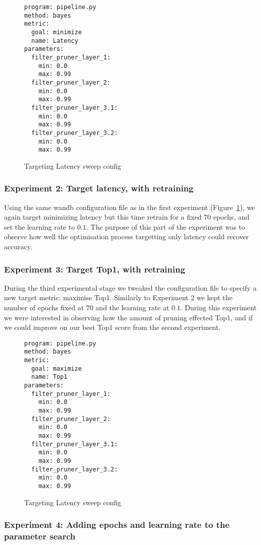 \documentclass[../Dissertation.tex]{subfiles}
\begin{document}
\singlespacing
\begin{figure}[H]
    \centering
    \begin{verbatim}
program: pipeline.py
method: bayes
metric:
  goal: minimize
  name: Latency
parameters:
  filter_pruner_layer_1:
    min: 0.0
    max: 0.99
  filter_pruner_layer_2:
    min: 0.0
    max: 0.99
  filter_pruner_layer_3.1:
    min: 0.0
    max: 0.99
  filter_pruner_layer_3.2:
    min: 0.0
    max: 0.99
    \end{verbatim}
    \caption{Targeting Latency sweep config}
    \label{fig:LatencySweepConfig}
\end{figure}
\doublespacing

\subsubsection{Experiment 2: Target latency, with retraining}

Using the same wandb configuration file as in the first experiment (Figure~\ref{fig:LatencySweepConfig}), we again target minimizing latency but this time retrain for a fixed $70$ epochs, and set the learning rate to $0.1$.
The purpose of this part of the experiment was to observe how well the optimisation process targetting only latency could recover accuracy.

\subsubsection{Experiment 3: Target Top1, with retraining}
During the third experimental stage we tweaked the configuration file to specify a new target metric: maximise Top1.
Similarly to Experiment 2 we kept the number of epochs fixed at $70$ and the learning rate at $0.1$.
During this experiment we were interested in observing how the amount of pruning effected Top1, and if we could improve on our best Top1 score from the second experiment.

\singlespacing
\begin{figure}[H]
    \centering
    \begin{verbatim}
program: pipeline.py
method: bayes
metric:
  goal: maximize
  name: Top1
parameters:
  filter_pruner_layer_1:
    min: 0.0
    max: 0.99
  filter_pruner_layer_2:
    min: 0.0
    max: 0.99
  filter_pruner_layer_3.1:
    min: 0.0
    max: 0.99
  filter_pruner_layer_3.2:
    min: 0.0
    max: 0.99
    \end{verbatim}
    \caption{Targeting Latency sweep config}
    \label{fig:Top1SweepConfig}
\end{figure}
\doublespacing

\subsubsection{Experiment 4: Adding epochs and learning rate to the parameter search}
\end{document}
